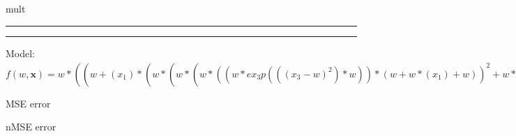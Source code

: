 \documentclass[12pt]{article}
\begin{document}
\begin{bundle}{mult}\end{bundle}

\hrule
\vspace{1cm}
\hrule
\vspace{1cm}
Model: $f(w,\mathbf{x})=w*((w+(x_1)*(w*(w*(w*((w*ex_3p(((x_3-w)^2)*w))*(w+w*(x_1)+w))^2+w*((w*ex_3p(((x_3-w)^2)*w))*(w+w*(x_1)+w))+w)))+w*(x_3))*(w*ex_3p(((x_3-w)^2)*w)))^2+w*((w+(x_1)*(w*(w*(w*((w*ex_3p(((x_3-w)^2)*w))*(w+w*(x_1)+w))^2+w*((w*ex_3p(((x_3-w)^2)*w))*(w+w*(x_1)+w))+w)))+w*(x_3))*(w*ex_3p(((x_3-w)^2)*w)))+w$

MSE error

nMSE error
\end{document}
